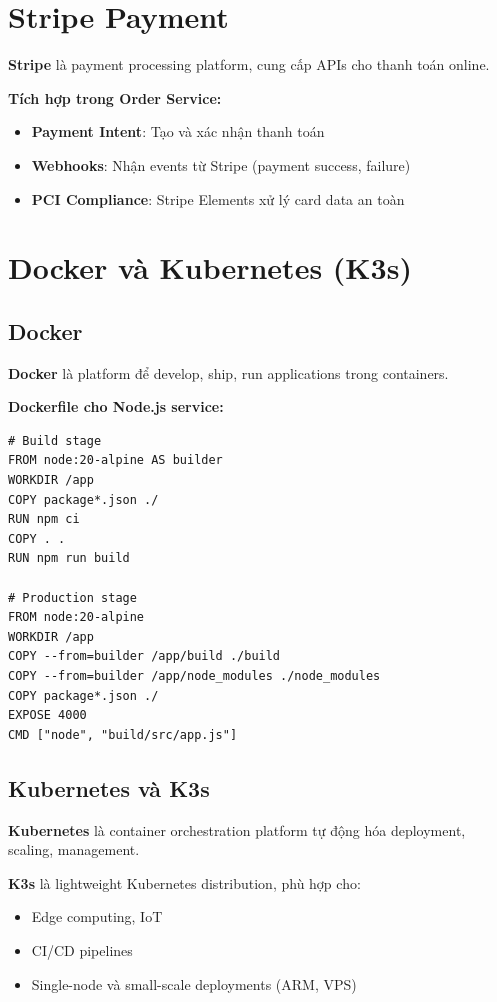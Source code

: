 \documentclass[12pt]{extreport}
\begin{document}
\section{Stripe Payment}

\textbf{Stripe} là payment processing platform, cung cấp APIs cho thanh toán online.

\textbf{Tích hợp trong Order Service:}
\begin{itemize}
    \item \textbf{Payment Intent}: Tạo và xác nhận thanh toán
    \item \textbf{Webhooks}: Nhận events từ Stripe (payment success, failure)
    \item \textbf{PCI Compliance}: Stripe Elements xử lý card data an toàn
\end{itemize}

\section{Docker và Kubernetes (K3s)}

\subsection{Docker}

\textbf{Docker} là platform để develop, ship, run applications trong containers.

\textbf{Dockerfile cho Node.js service:}
\begin{lstlisting}[style=BashStyle, caption={Dockerfile cho Gateway Service}]
# Build stage
FROM node:20-alpine AS builder
WORKDIR /app
COPY package*.json ./
RUN npm ci
COPY . .
RUN npm run build

# Production stage
FROM node:20-alpine
WORKDIR /app
COPY --from=builder /app/build ./build
COPY --from=builder /app/node_modules ./node_modules
COPY package*.json ./
EXPOSE 4000
CMD ["node", "build/src/app.js"]
\end{lstlisting}

\subsection{Kubernetes và K3s}

\textbf{Kubernetes} là container orchestration platform tự động hóa deployment, scaling, management.

\textbf{K3s} là lightweight Kubernetes distribution, phù hợp cho:
\begin{itemize}
    \item Edge computing, IoT
    \item CI/CD pipelines
    \item Single-node và small-scale deployments (ARM, VPS)
\end{itemize}
\end{document}

